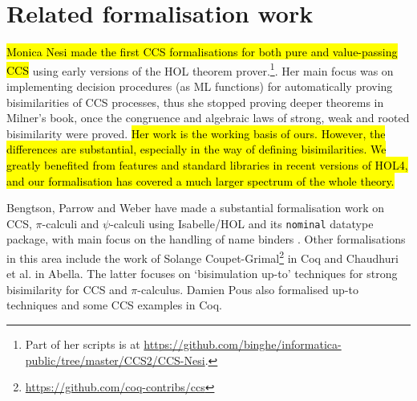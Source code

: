 \section{Related formalisation work}
\label{s:rel}

\hl{Monica Nesi made the first CCS formalisations for both pure and
value-passing CCS} \cite{Nesi:1992ve,Nesi:2017wo} using early versions of the HOL
theorem prover.\footnote{Part of 
 her scripts is at \url{https://github.com/binghe/informatica-public/tree/master/CCS2/CCS-Nesi}.}.
Her main focus was on implementing decision procedures (as ML functions) for
automatically proving bisimilarities of CCS
processes, thus she stopped proving deeper theorems in Milner's book, once the congruence and algebraic laws of
strong, weak and rooted bisimilarity were proved. \hl{Her work is
  the working basis of ours. However, the differences are substantial, especially in the way of defining
bisimilarities. We greatly benefited from features and standard
libraries in recent versions of HOL4, and our formalisation has
covered a much larger spectrum of the whole theory.}

Bengtson,  Parrow and Weber
have made a substantial formalisation work 
on CCS, $\pi$-calculi
and $\psi$-calculi 
using Isabelle/HOL and its \texttt{nominal} datatype package, with main focus on the handling of
name binders \cite{bengtson2010formalising,bengtson2007completeness,bengtson2007formalising}.
%
Other formalisations in this area include the work of Solange
Coupet-Grimal\footnote{\url{https://github.com/coq-contribs/ccs}} in Coq
and Chaudhuri et al.\;\cite{chaudhuri2015lightweight} in Abella. The
latter focuses on `bisimulation up-to' techniques for strong bisimilarity 
for CCS and $\pi$-calculus.
Damien Pous also formalised up-to techniques and some CCS examples in
Coq. \cite{pous2007new}
